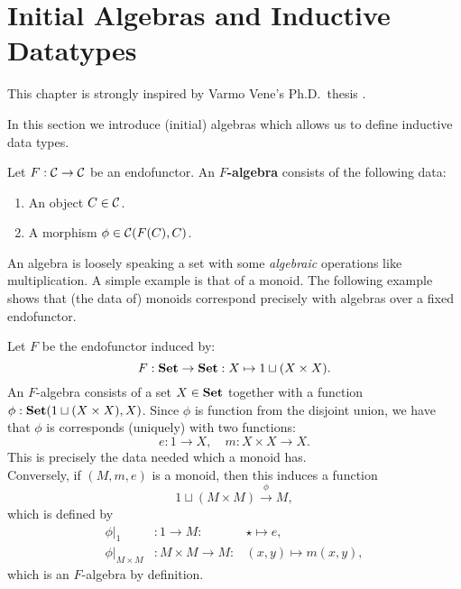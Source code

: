 
\section{Initial Algebras and Inductive Datatypes}
\label{sec:initial-algs}

\begin{reading*}
  This chapter is strongly inspired by Varmo Vene's Ph.D.\ thesis \cite[Chapter 2]{vene_phd}.
\end{reading*}

In this section we introduce (initial) algebras which allows us to define inductive data types.

\begin{dfn} Let $F:\mathcal{C}\to \mathcal{C}$ be an endofunctor. An \textbf{$F$-algebra} consists of the following data:
\begin{enumerate}
\item An object $C\in \mathcal{C}$.
\item A morphism $\phi \in {\mathcal{C}}(F(C),C)$.
\end{enumerate}
\end{dfn}

\begin{intu} An algebra is loosely speaking a set with some \textit{algebraic} operations like multiplication. A simple example is that of a monoid. The following example shows that (the data of) monoids correspond precisely with algebras over a fixed endofunctor.
\end{intu}

\begin{exa}\label{example:algebra_of_monoids} Let $F$ be the endofunctor induced by:
\[
F: \mathbf{Set} \to \mathbf{Set}: X \mapsto 1\sqcup (X\times X).
\]
An $F$-algebra consists of a set $X\in\mathbf{Set}$ together with a function $\phi:{\mathbf{Set}}(1\sqcup (X\times X),X)$. Since $\phi$ is function from the disjoint union, we have that $\phi$ is corresponds (uniquely) with two functions:
\[
e: 1\to X,\quad m:X\times X\to X.
\]
This is precisely the data needed which a monoid has.\\
Conversely, if $(M,m,e)$ is a monoid, then this induces a function
\[
1 \sqcup (M\times M) \xrightarrow{\phi} M,
\]
which is defined by 
\begin{eqnarray*}
\phi\vert_{1} &: 1\to M: &\star\mapsto e,\\
\phi\vert_{M\times M} &: M\times M\to M: &(x,y)\mapsto m(x,y),
\end{eqnarray*}
which is an $F$-algebra by definition.

\end{exa}

